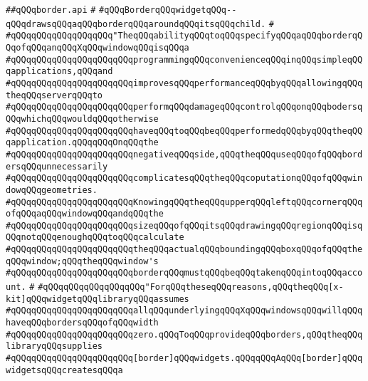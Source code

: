 \label{src/lib/x-kit/widget/old/wrapper/border.api}
\verb|##qQQqborder.api|\newline
\verb|#|\newline
\verb|#qQQqBorderqQQqwidgetqQQq--qQQqdrawsqQQqaqQQqborderqQQqaroundqQQqitsqQQqchild.|\newline
\verb|#|\newline
\verb|#qQQqqQQqqQQqqQQqqQQq"TheqQQqabilityqQQqtoqQQqspecifyqQQqaqQQqborderqQQqofqQQqanqQQqXqQQqwindowqQQqisqQQqa|\newline
\verb|#qQQqqQQqqQQqqQQqqQQqqQQqprogrammingqQQqconvenienceqQQqinqQQqsimpleqQQqapplications,qQQqand|\newline
\verb|#qQQqqQQqqQQqqQQqqQQqqQQqimprovesqQQqperformanceqQQqbyqQQqallowingqQQqtheqQQqserverqQQqto|\newline
\verb|#qQQqqQQqqQQqqQQqqQQqqQQqperformqQQqdamageqQQqcontrolqQQqonqQQqbodersqQQqwhichqQQqwouldqQQqotherwise|\newline
\verb|#qQQqqQQqqQQqqQQqqQQqqQQqhaveqQQqtoqQQqbeqQQqperformedqQQqbyqQQqtheqQQqapplication.qQQqqQQqOnqQQqthe|\newline
\verb|#qQQqqQQqqQQqqQQqqQQqqQQqnegativeqQQqside,qQQqtheqQQquseqQQqofqQQqbordersqQQqunnecessarily|\newline
\verb|#qQQqqQQqqQQqqQQqqQQqqQQqcomplicatesqQQqtheqQQqcoputationqQQqofqQQqwindowqQQqgeometries.|\newline
\verb|#qQQqqQQqqQQqqQQqqQQqqQQqKnowingqQQqtheqQQqupperqQQqleftqQQqcornerqQQqofqQQqaqQQqwindowqQQqandqQQqthe|\newline
\verb|#qQQqqQQqqQQqqQQqqQQqqQQqsizeqQQqofqQQqitsqQQqdrawingqQQqregionqQQqisqQQqnotqQQqenoughqQQqtoqQQqcalculate|\newline
\verb|#qQQqqQQqqQQqqQQqqQQqqQQqtheqQQqactualqQQqboundingqQQqboxqQQqofqQQqtheqQQqwindow;qQQqtheqQQqwindow's|\newline
\verb|#qQQqqQQqqQQqqQQqqQQqqQQqborderqQQqmustqQQqbeqQQqtakenqQQqintoqQQqaccount.|\newline
\verb|#|\newline
\verb|#qQQqqQQqqQQqqQQqqQQq"ForqQQqtheseqQQqreasons,qQQqtheqQQq[x-kit]qQQqwidgetqQQqlibraryqQQqassumes|\newline
\verb|#qQQqqQQqqQQqqQQqqQQqqQQqallqQQqunderlyingqQQqXqQQqwindowsqQQqwillqQQqhaveqQQqbordersqQQqofqQQqwidth|\newline
\verb|#qQQqqQQqqQQqqQQqqQQqqQQqzero.qQQqToqQQqprovideqQQqborders,qQQqtheqQQqlibraryqQQqsupplies|\newline
\verb|#qQQqqQQqqQQqqQQqqQQqqQQq[border]qQQqwidgets.qQQqqQQqAqQQq[border]qQQqwidgetsqQQqcreatesqQQqa|\newline
